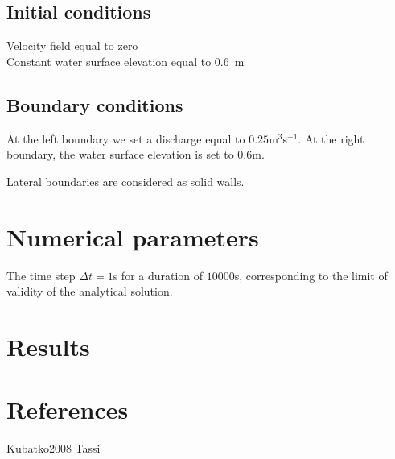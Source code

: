 \subsection{Initial conditions}
%
Velocity field equal to zero\\
Constant water surface elevation equal to $0.6$~m
%
\subsection{Boundary conditions}
%
At the left boundary we set a discharge equal to $0.25$m$^3$s$^{-1}$. At the right boundary, the water surface elevation is set to $0.6$m.

Lateral boundaries are considered as solid walls.
%

%
%
\section{Numerical parameters}

The time step $\Delta t=1$s for a duration of $10000$s, corresponding to the limit of validity of the analytical solution.
%
%
\section{Results}
%

%
\section{References}
%
Kubatko2008
Tassi
%
%




